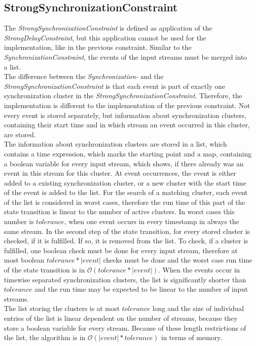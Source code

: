 \subsection{StrongSynchronizationConstraint}
	The \emph{StrongSynchronizationConstraint} is defined as application of the \emph{StrongDelayConstraint}, but this application cannot be used for the implementation, like in the previous constraint. Similar to the \emph{SynchronizationConstraint}, the events of the input streams must be merged into a list.\\
	The difference between the \emph{Synchronization-} and the \emph{StrongSynchronizationConstraint} is that each event is part of exactly one synchronization cluster in the \emph{StrongSynchronizationConstraint}. Therefore, the implementation is different to the implementation of the previous constraint. Not every event is stored separately, but information about synchronization clusters, containing their start time and in which stream an event occurred in this cluster, are stored.\\
	The information about synchronization clusters are stored in a list, which contains a time expression, which marks the starting point and a map, containing a boolean variable for every input stream, which shows, if there already was an event in this stream for this cluster. At event occurrences, the event is either added to a existing synchronization cluster, or a new cluster with the start time of the event is added to the list. For the search of a matching cluster, each event of the list is considered in worst cases, therefore the run time of this part of the state transition is linear to the number of active clusters. In worst cases this number is $tolerance$, when one event occurs in every timestamp in always the same stream. In the second step of the state transition, for every stored cluster is checked, if it is fulfilled. If so, it is removed from the list. To check, if a cluster is fulfilled, one boolean check must be done for every input stream, therefore at most boolean $tolerance*|event|$ checks must be done and the worst case run time of the state transition is in $\mathcal{O}(tolerance * |event|)$. When the events occur in timewise separated synchronization clusters, the list is significantly shorter than $tolerance$ and the run time may be expected to be linear to the number of input streams.\\
	The list storing the clusters is at most $tolerance$ long and the size of individual entries of the list is linear dependent on the number of streams, because they store a boolean variable for every stream. Because of these length restrictions of the list, the algorithm is in $\mathcal{O}(|event|*tolerance)$ in terms of memory.\\

